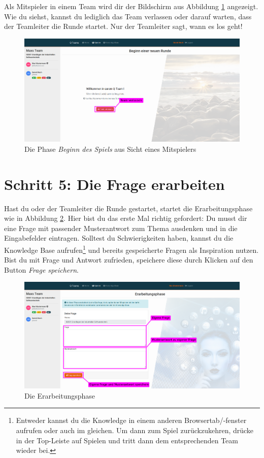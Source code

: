 \documentclass[a4paper,11pt,listof=numbered,glossary=totoc,parskip=half,toc=bib]{scrreprt}
\begin{document}
\begin{appendices}
	Als Mitspieler in einem Team wird dir der Bildschirm aus Abbildung \ref{fig:guide_beginn_spieler} angezeigt. Wie du siehst, kannst du lediglich das Team verlassen oder darauf warten, dass der Teamleiter die Runde startet. Nur der Teamleiter sagt, wann es los geht!
	\begin{figure}[h!]
		\centering
		\includegraphics[width=\textwidth]{UserGuide/Rundenbeginn_Spieler.png}
		\caption{Die Phase \textit{Beginn des Spiels} aus Sicht eines Mitspielers}
		\label{fig:guide_beginn_spieler}
	\end{figure}
	
	\newpage
	\section*{Schritt 5: Die Frage erarbeiten}	
		
	Hast du oder der Teamleiter	 die Runde gestartet, startet die Erarbeitungsphase wie in Abbildung \ref{fig:guide_erarbeitungsphase}. Hier bist du das erste Mal richtig gefordert: Du musst dir eine Frage mit passender Musterantwort zum Thema ausdenken und in die Eingabefelder eintragen. Solltest du Schwierigkeiten haben, kannst du die Knowledge Base aufrufen\footnote{Entweder kannst du die Knowledge in einem anderen Browsertab/-fenster aufrufen oder auch im gleichen. Um dann zum Spiel zurückzukehren, drücke in der Top-Leiste auf Spielen und tritt dann dem entsprechenden Team wieder bei.} und bereits gespeicherte Fragen als Inspiration nutzen. Bist du mit Frage und Antwort zufrieden, speichere diese durch Klicken auf den Button \textit{Frage speichern}. 
	\begin{figure}[h!]
		\centering
		\includegraphics[width=\textwidth]{UserGuide/Erarbeitungsphase.png}
		\caption{Die Erarbeitungsphase}
		\label{fig:guide_erarbeitungsphase}
	\end{figure}	
	

\end{appendices}
\end{document}
